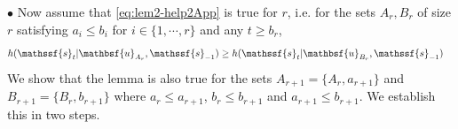 \documentclass[journal, twocolumn, 10pt]{IEEEtran}
\newcommand{\rvs}{{\mathssf{s}}}    %
\newcommand{\rvu}{{\mathssf{u}}}    %
\newcommand{\rvbu}{{\mathbsf{u}}}
\begin{document}
{%

$\bullet$ Now assume that \eqref{eq:lem2-help2App} is true for $r$, i.e. for the sets $A_r,B_r$ of size $r$ satisfying $a_{i}\le b_{i}$ for $i \in \{1,\cdots, r\}$ and any $t\ge b_{r}$, 
\begin{align}
&h(\rvs_{t}|\rvbu_{A_r}, \rvs_{-1}) \ge h(\rvs_{t}|\rvbu_{B_r}, \rvs_{-1}) \label{ni5sec}
\end{align} We  show that  the lemma is also true for the sets $A_{r+1} = \{A_{r}, a_{r+1}\}$ and $B_{r+1}=\{B_{r}, b_{r+1}\}$ where $a_{r} \le a_{r+1}$, $b_{r} \le b_{r+1}$ and $a_{r+1} \le b_{r+1}$.  We establish this in two steps.

}
\end{document}
